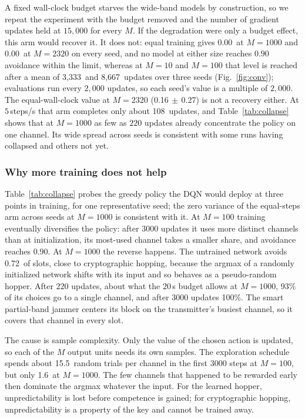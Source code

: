 \documentclass[journal]{IEEEtran}
\newcommand{\dqnBudgetMax}{0.16}
\newcommand{\dqnStepKilo}{0.00}
\newcommand{\dqnStepMax}{0.00}        %
\newcommand{\dqnBudgetMaxSd}{0.27}    %
\newcommand{\budgetStepsMax}{108}     %
\newcommand{\convTen}{3,333}          %
\newcommand{\convHundred}{8,667}      %
\newcommand{\collapseUntrained}{0.72} %
\newcommand{\collapseEarlyShare}{93}  %
\newcommand{\collapseLateShare}{100}  %
\newcommand{\collapseHundredLate}{0.90} %
\newcommand{\exploreHundred}{15.5}    %
\newcommand{\exploreKilo}{1.6}        %
\begin{document}
A fixed wall-clock budget starves the wide-band models by construction, so we
repeat the experiment with the budget removed and the number of gradient
updates held at $15{,}000$ for every $M$. If the degradation were only a budget
effect, this arm would recover it. It does not: equal training gives
\dqnStepKilo\ at $M{=}1000$ and \dqnStepMax\ at $M{=}2320$ on every seed, and no
model at either size reaches $0.90$ avoidance within the limit, whereas at
$M{=}10$ and $M{=}100$ that level is reached after a mean of \convTen\ and
\convHundred\ updates over three seeds (Fig.~\ref{fig:conv}); evaluations run
every $2{,}000$ updates, so each seed's value is a multiple of $2{,}000$. The
equal-wall-clock value at $M{=}2320$ (\dqnBudgetMax$\,\pm\,$\dqnBudgetMaxSd) is
not a recovery either. At $5$\,steps/s that arm completes only about
\budgetStepsMax\ updates, and Table~\ref{tab:collapse} shows that at $M{=}1000$
as few as $220$ updates already concentrate the policy on one channel. Its wide
spread across seeds is consistent with some runs having collapsed and others not
yet.

\subsubsection*{Why more training does not help}
Table~\ref{tab:collapse} probes the greedy policy the DQN would deploy at three
points in training, for one representative seed; the zero variance of the
equal-steps arm across seeds at $M{=}1000$ is consistent with it. At $M{=}100$ training eventually diversifies the policy:
after $3000$ updates it uses more distinct channels than at initialization, its
most-used channel takes a smaller share, and avoidance reaches
\collapseHundredLate. At $M{=}1000$ the reverse
happens. The untrained network avoids \collapseUntrained\ of slots, close to
cryptographic hopping, because the argmax of a randomly initialized network
shifts with its input and so behaves as a pseudo-random hopper. After $220$
updates, about what the $20$\,s budget allows at $M{=}1000$, \collapseEarlyShare\% of its choices go to a single channel, and after
$3000$ updates \collapseLateShare\%. The smart partial-band jammer centers its
block on the transmitter's busiest channel, so it covers that channel in every
slot.

The cause is sample complexity. Only the value of the chosen action is updated,
so each of the $M$ output units needs its own samples. The exploration
schedule spends about \exploreHundred\ random trials per channel in the first
$3000$ steps at $M{=}100$, but only \exploreKilo\ at $M{=}1000$. The few
channels that happened to be rewarded early then dominate the argmax whatever
the input. For the learned hopper, unpredictability is lost before competence is
gained; for cryptographic hopping, unpredictability is a property of the key and
cannot be trained away.
\end{document}
